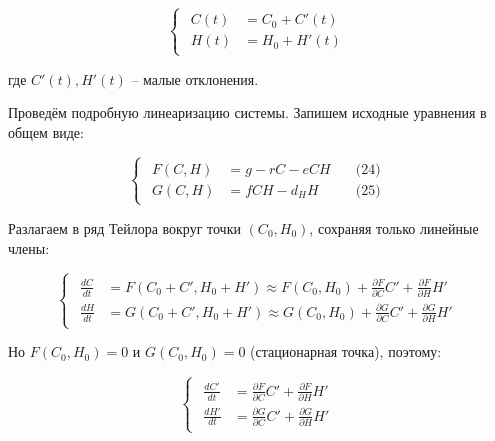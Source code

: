 \documentclass[a4paper, 14pt]{extarticle}
\begin{document}
\begin{equation}
    \begin{cases}
        \begin{aligned}
            C(t) &= C_0 + C'(t) \\
            H(t) &= H_0 + H'(t)
        \end{aligned}
    \end{cases}
\end{equation}

где $C'(t), H'(t)$ -- малые отклонения.

Проведём подробную линеаризацию системы. Запишем исходные уравнения в общем виде:

\begin{equation}
    \begin{cases}
        \begin{aligned}
            F(C,H) &= g - r C - e C H \quad &\text{(24)} \\
            G(C,H) &= f C H - d_H H \quad &\text{(25)}
        \end{aligned}
    \end{cases}
\end{equation}

Разлагаем в ряд Тейлора вокруг точки $(C_0, H_0)$, сохраняя только линейные члены:

\begin{equation}
    \begin{cases}
        \begin{aligned}
    \frac{dC}{dt} &= F(C_0 + C', H_0 + H') \approx F(C_0, H_0) + \frac{\partial F}{\partial C}C' + \frac{\partial F}{\partial H}H' \\
    \frac{dH}{dt} &= G(C_0 + C', H_0 + H') \approx G(C_0, H_0) + \frac{\partial G}{\partial C}C' + \frac{\partial G}{\partial H}H'
        \end{aligned}
    \end{cases}
\end{equation}

Но $F(C_0, H_0) = 0$ и $G(C_0, H_0) = 0$ (стационарная точка), поэтому:

\begin{equation}
    \begin{cases}
        \begin{aligned}
    \frac{dC'}{dt} &= \frac{\partial F}{\partial C}C' + \frac{\partial F}{\partial H}H' \\
    \frac{dH'}{dt} &= \frac{\partial G}{\partial C}C' + \frac{\partial G}{\partial H}H'
        \end{aligned}
    \end{cases}
\end{equation}
\end{document}

